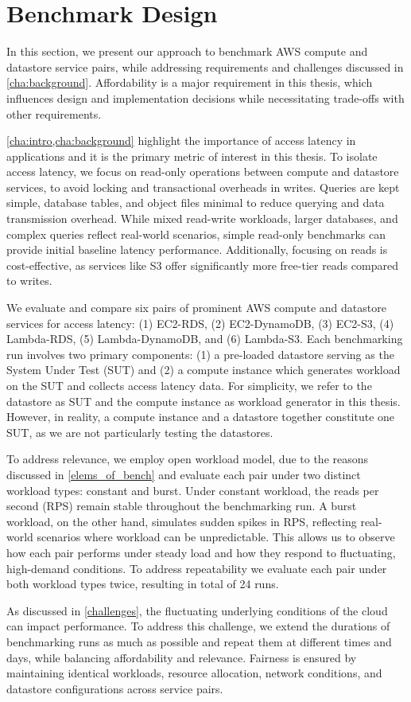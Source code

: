 \section{Benchmark Design}
\label{cha:approach}

In this section, we present our approach to benchmark AWS compute and datastore service pairs, while addressing requirements and challenges discussed in \cref{cha:background}. Affordability is a major requirement in this thesis, which influences design and implementation decisions while necessitating trade-offs with other requirements.

\cref{cha:intro,cha:background} highlight the importance of access latency in applications and it is the primary metric of interest in this thesis. To isolate access latency, we focus on read-only operations between compute and datastore services, to avoid locking and transactional overheads in writes. Queries are kept simple, database tables, and object files minimal to reduce querying and data transmission overhead. While mixed read-write workloads, larger databases, and complex queries reflect real-world scenarios, simple read-only benchmarks can provide initial baseline latency performance. Additionally, focusing on reads is cost-effective, as services like S3 offer significantly more free-tier reads compared to writes.

We evaluate and compare six pairs of prominent AWS compute and datastore services for access latency: (1) EC2-RDS, (2) EC2-DynamoDB, (3) EC2-S3, (4) Lambda-RDS, (5) Lambda-DynamoDB, and (6) Lambda-S3. Each benchmarking run involves two primary components: (1) a pre-loaded datastore serving as the System Under Test (SUT) and (2) a compute instance which generates workload on the SUT and collects access latency data. For simplicity, we refer to the datastore as SUT and the compute instance as workload generator in this thesis. However, in reality, a compute instance and a datastore together constitute one SUT, as we are not particularly testing the datastores.

To address relevance, we employ open workload model, due to the reasons discussed in \cref{elems_of_bench} and evaluate each pair under two distinct workload types: constant and burst. Under constant workload, the reads per second (RPS) remain stable throughout the benchmarking run. A burst workload, on the other hand, simulates sudden spikes in RPS, reflecting real-world scenarios where workload can be unpredictable. This allows us to observe how each pair performs under steady load and how they respond to fluctuating, high-demand conditions. To address repeatability we evaluate each pair under both workload types twice, resulting in total of 24 runs.

As discussed in \cref{challenges}, the fluctuating underlying conditions of the cloud can impact performance. To address this challenge, we extend the durations of benchmarking runs as much as possible and repeat them at different times and days, while balancing affordability and relevance. Fairness is ensured by maintaining identical workloads, resource allocation, network conditions, and datastore configurations across service pairs.
